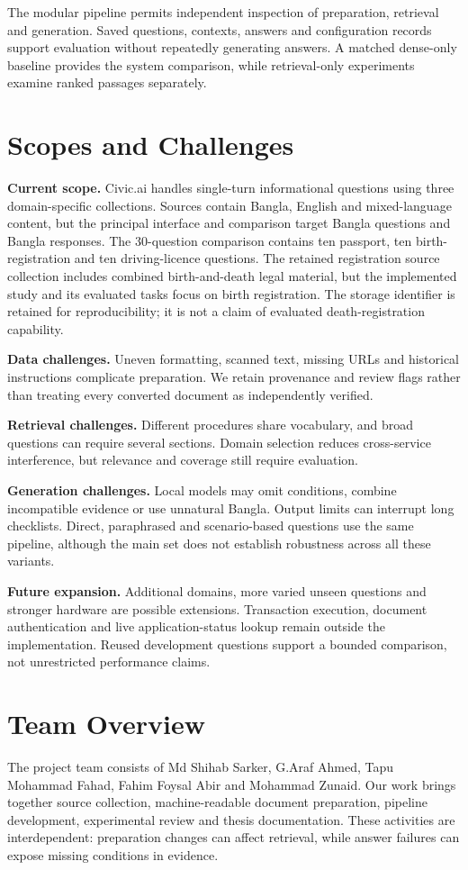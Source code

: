 The modular pipeline permits independent inspection of preparation, retrieval and generation. Saved questions, contexts, answers and configuration records support evaluation without repeatedly generating answers. A matched dense-only baseline provides the system comparison, while retrieval-only experiments examine ranked passages separately.

\section{Scopes and Challenges}
\textbf{Current scope.} Civic.ai handles single-turn informational questions using three domain-specific collections. Sources contain Bangla, English and mixed-language content, but the principal interface and comparison target Bangla questions and Bangla responses. The 30-question comparison contains ten passport, ten birth-registration and ten driving-licence questions. The retained registration source collection includes combined birth-and-death legal material, but the implemented study and its evaluated tasks focus on birth registration. The storage identifier is retained for reproducibility; it is not a claim of evaluated death-registration capability.

\textbf{Data challenges.} Uneven formatting, scanned text, missing URLs and historical instructions complicate preparation. We retain provenance and review flags rather than treating every converted document as independently verified.

\textbf{Retrieval challenges.} Different procedures share vocabulary, and broad questions can require several sections. Domain selection reduces cross-service interference, but relevance and coverage still require evaluation.

\textbf{Generation challenges.} Local models may omit conditions, combine incompatible evidence or use unnatural Bangla. Output limits can interrupt long checklists. Direct, paraphrased and scenario-based questions use the same pipeline, although the main set does not establish robustness across all these variants.

\textbf{Future expansion.} Additional domains, more varied unseen questions and stronger hardware are possible extensions. Transaction execution, document authentication and live application-status lookup remain outside the implementation. Reused development questions support a bounded comparison, not unrestricted performance claims.

\section{Team Overview}
The project team consists of Md Shihab Sarker, G.Araf Ahmed, Tapu Mohammad Fahad, Fahim Foysal Abir and Mohammad Zunaid. Our work brings together source collection, machine-readable document preparation, pipeline development, experimental review and thesis documentation. These activities are interdependent: preparation changes can affect retrieval, while answer failures can expose missing conditions in evidence.


